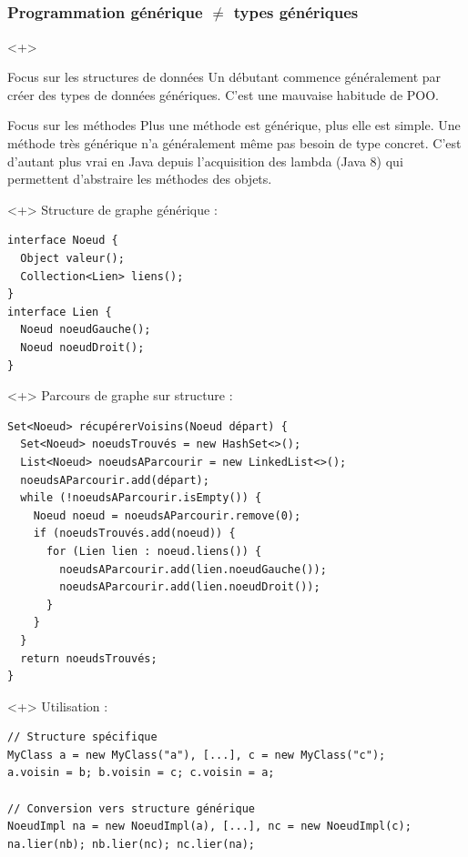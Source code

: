 \documentclass[draft]{beamer}
\begin{document}
\subsection{}

\begin{frame}[fragile]
\frametitle{Programmation générique $\neq$ types génériques}
\begin{onlyenv}<+>
  \begin{alertblock}{Focus sur les structures de données}
    Un débutant commence généralement par créer des types de données génériques.
    C'est une mauvaise habitude de POO.
  \end{alertblock}
  \begin{exampleblock}{Focus sur les méthodes}
    Plus une méthode est générique, plus elle est simple.
    Une méthode très générique n'a généralement même pas besoin de type concret.
    C'est d'autant plus vrai en Java depuis l'acquisition des lambda (Java 8) qui permettent d'abstraire les méthodes des objets.
  \end{exampleblock}
\end{onlyenv}
\begin{onlyenv}<+>
  Structure de graphe générique :
  \begin{lstlisting}
interface Noeud {
  Object valeur();
  Collection<Lien> liens();
}
interface Lien {
  Noeud noeudGauche();
  Noeud noeudDroit();
}
  \end{lstlisting}
\end{onlyenv}
\begin{onlyenv}<+>
  Parcours de graphe sur structure :
  \begin{lstlisting}
Set<Noeud> récupérerVoisins(Noeud départ) {
  Set<Noeud> noeudsTrouvés = new HashSet<>();
  List<Noeud> noeudsAParcourir = new LinkedList<>();
  noeudsAParcourir.add(départ);
  while (!noeudsAParcourir.isEmpty()) {
    Noeud noeud = noeudsAParcourir.remove(0);
    if (noeudsTrouvés.add(noeud)) {
      for (Lien lien : noeud.liens()) {
        noeudsAParcourir.add(lien.noeudGauche());
        noeudsAParcourir.add(lien.noeudDroit());
      }
    }
  }
  return noeudsTrouvés;
}
  \end{lstlisting}
\end{onlyenv}
\begin{onlyenv}<+>
  Utilisation :
  \begin{lstlisting}
// Structure spécifique
MyClass a = new MyClass("a"), [...], c = new MyClass("c");
a.voisin = b; b.voisin = c; c.voisin = a;

// Conversion vers structure générique
NoeudImpl na = new NoeudImpl(a), [...], nc = new NoeudImpl(c);
na.lier(nb); nb.lier(nc); nc.lier(na);


\end{lstlisting}
\end{onlyenv}
\end{frame}
\end{document}
